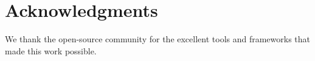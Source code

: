 \documentclass[11pt]{article}
\begin{document}
\section*{Acknowledgments}

We thank the open-source community for the excellent tools and frameworks that made this work possible.



\end{document}
